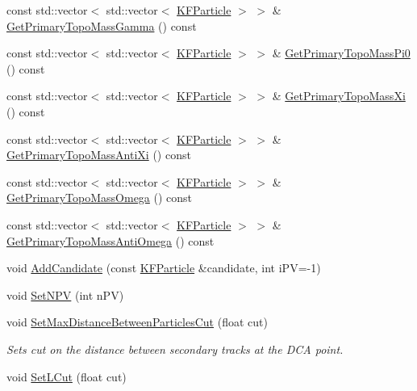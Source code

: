 \begin{DoxyCompactItemize}
\item 
const std\+::vector$<$ std\+::vector$<$ \hyperlink{classKFParticle}{K\+F\+Particle} $>$ $>$ \& \hyperlink{classKFParticleFinder_ae0584f1027f7eaea6e0b2dd01c4d28dc}{Get\+Primary\+Topo\+Mass\+Gamma} () const 
\item 
const std\+::vector$<$ std\+::vector$<$ \hyperlink{classKFParticle}{K\+F\+Particle} $>$ $>$ \& \hyperlink{classKFParticleFinder_ad628e43af43e4f535267831a92dc7eec}{Get\+Primary\+Topo\+Mass\+Pi0} () const 
\item 
const std\+::vector$<$ std\+::vector$<$ \hyperlink{classKFParticle}{K\+F\+Particle} $>$ $>$ \& \hyperlink{classKFParticleFinder_a2e4897510c71ca2a73be9b5f9a734a9e}{Get\+Primary\+Topo\+Mass\+Xi} () const 
\item 
const std\+::vector$<$ std\+::vector$<$ \hyperlink{classKFParticle}{K\+F\+Particle} $>$ $>$ \& \hyperlink{classKFParticleFinder_a311f55676ac79505b5a4e965d1869e3b}{Get\+Primary\+Topo\+Mass\+Anti\+Xi} () const 
\item 
const std\+::vector$<$ std\+::vector$<$ \hyperlink{classKFParticle}{K\+F\+Particle} $>$ $>$ \& \hyperlink{classKFParticleFinder_a3cdf08e30f5a5ea65ac46e5d34f1ebee}{Get\+Primary\+Topo\+Mass\+Omega} () const 
\item 
const std\+::vector$<$ std\+::vector$<$ \hyperlink{classKFParticle}{K\+F\+Particle} $>$ $>$ \& \hyperlink{classKFParticleFinder_a02002e69766b313a73dab1c7485563a7}{Get\+Primary\+Topo\+Mass\+Anti\+Omega} () const 
\item 
void \hyperlink{classKFParticleFinder_ae9f91e17b13fc0308e91ec759b44aa1f}{Add\+Candidate} (const \hyperlink{classKFParticle}{K\+F\+Particle} \&candidate, int i\+PV=-\/1)
\item 
void \hyperlink{classKFParticleFinder_a043ff4f3c29d55030686e4614aa241b9}{Set\+N\+PV} (int n\+PV)
\item 
void \hyperlink{classKFParticleFinder_a6a4e25b5304d7cfa15125df8e176dbb4}{Set\+Max\+Distance\+Between\+Particles\+Cut} (float cut)\hypertarget{classKFParticleFinder_a6a4e25b5304d7cfa15125df8e176dbb4}{}\label{classKFParticleFinder_a6a4e25b5304d7cfa15125df8e176dbb4}

\begin{DoxyCompactList}\small\item\em Sets cut on the distance between secondary tracks at the D\+CA point. \end{DoxyCompactList}\item 
void \hyperlink{classKFParticleFinder_a008880a3eae2081ef00d8358c40c59ba}{Set\+L\+Cut} (float cut)\hypertarget{classKFParticleFinder_a008880a3eae2081ef00d8358c40c59ba}{}\label{classKFParticleFinder_a008880a3eae2081ef00d8358c40c59ba}


\end{DoxyCompactItemize}
